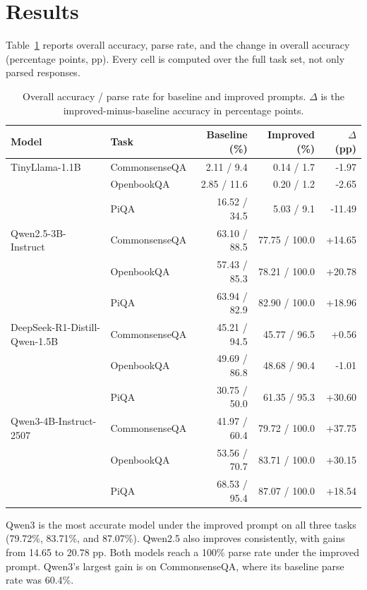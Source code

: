 \documentclass[10pt,twocolumn]{article}
\begin{document}
\section{Results}
Table~\ref{tab:results} reports overall accuracy, parse rate, and the change in overall accuracy (percentage points, pp). Every cell is computed over the full task set, not only parsed responses.

\begin{table}[t]
\centering
\small
\setlength{\tabcolsep}{5pt}
\caption{Overall accuracy / parse rate for baseline and improved prompts. $\Delta$ is the improved-minus-baseline accuracy in percentage points.}
\label{tab:results}
\begin{tabular}{@{}llrrr@{}}
\toprule
Model & Task & Baseline (\%) & Improved (\%) & $\Delta$ (pp)\\
\midrule
TinyLlama-1.1B & CommonsenseQA & 2.11 / 9.4 & 0.14 / 1.7 & -1.97\\
 & OpenbookQA & 2.85 / 11.6 & 0.20 / 1.2 & -2.65\\
 & PiQA & 16.52 / 34.5 & 5.03 / 9.1 & -11.49\\
\midrule
Qwen2.5-3B-Instruct & CommonsenseQA & 63.10 / 88.5 & 77.75 / 100.0 & +14.65\\
 & OpenbookQA & 57.43 / 85.3 & 78.21 / 100.0 & +20.78\\
 & PiQA & 63.94 / 82.9 & 82.90 / 100.0 & +18.96\\
\midrule
DeepSeek-R1-Distill-Qwen-1.5B & CommonsenseQA & 45.21 / 94.5 & 45.77 / 96.5 & +0.56\\
 & OpenbookQA & 49.69 / 86.8 & 48.68 / 90.4 & -1.01\\
 & PiQA & 30.75 / 50.0 & 61.35 / 95.3 & +30.60\\
\midrule
Qwen3-4B-Instruct-2507 & CommonsenseQA & 41.97 / 60.4 & 79.72 / 100.0 & +37.75\\
 & OpenbookQA & 53.56 / 70.7 & 83.71 / 100.0 & +30.15\\
 & PiQA & 68.53 / 95.4 & 87.07 / 100.0 & +18.54\\
\bottomrule
\end{tabular}
\end{table}

Qwen3 is the most accurate model under the improved prompt on all three tasks (79.72\%, 83.71\%, and 87.07\%). Qwen2.5 also improves consistently, with gains from 14.65 to 20.78 pp. Both models reach a 100\% parse rate under the improved prompt. Qwen3's largest gain is on CommonsenseQA, where its baseline parse rate was 60.4\%.
\end{document}
